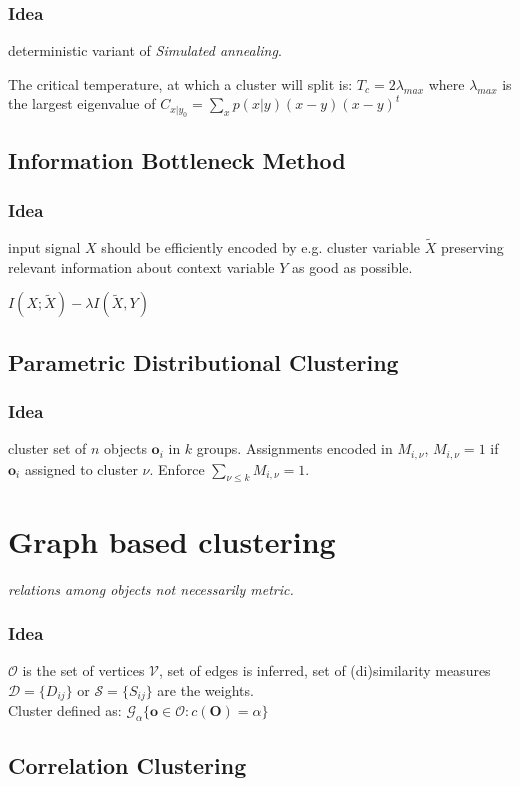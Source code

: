 \documentclass[9pt,parskip]{scrartcl}
\begin{document}
\begin{multicols*}{4}
\subsubsection*{Idea}
deterministic variant of \textit{Simulated annealing}.

The critical temperature, at which a cluster will split is:
$T_c = 2\lambda_{max}$ where $\lambda_{max}$ is the largest eigenvalue of $C_{x|y_0} = \sum_x p(x|y)(x-y)(x-y)^t$

\subsection*{Information Bottleneck Method}
\subsubsection*{Idea}
input signal $X$ should be efficiently encoded by e.g. cluster variable $\tilde{X}$ preserving relevant information about context variable $Y$ as good as possible.

$ I(X; \tilde{X}) - \lambda I(\tilde{X}, Y)$

\subsection*{Parametric Distributional Clustering}
\subsubsection*{Idea}
cluster set of $n$ objects $\mathbf{o}_i$ in $k$ groups. Assignments encoded in $M_{i, \nu}$, $M_{i, \nu} = 1$ if $\mathbf{o}_i$ assigned to cluster $\nu$. Enforce $\sum_{\nu \leq k} M_{i, \nu} = 1$.

\section*{Graph based clustering}
\textit{relations among objects not necessarily metric.}
\subsubsection*{Idea}
$\mathcal{O}$ is the set of vertices $\mathcal{V}$, set of edges is inferred, set of (di)similarity measures $\mathcal{D}=\{D_{ij}\}$ or $\mathcal{S}=\{S_{ij}\}$ are the weights. \\
Cluster defined as: $\mathcal{G}_{\alpha} \{ \mathbf{o} \in \mathcal{O} : c( \mathbf{O}) = \alpha\}$
\subsection*{Correlation Clustering}

\end{multicols*}
\end{document}
